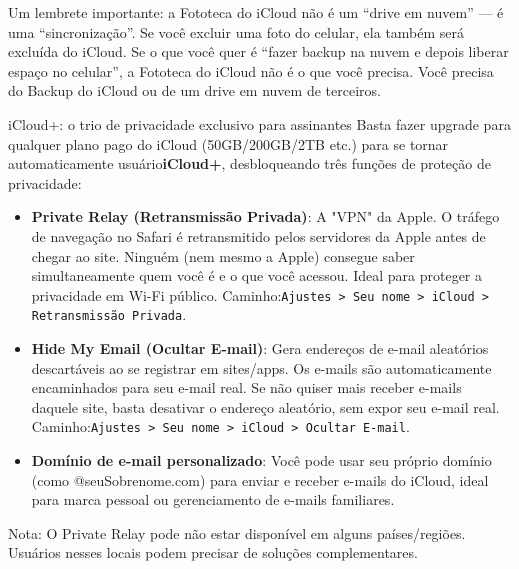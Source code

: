 Um lembrete importante: a Fototeca do iCloud não é um “drive em nuvem” — é uma “sincronização”. Se você excluir uma foto do celular, ela também será excluída do iCloud. Se o que você quer é “fazer backup na nuvem e depois liberar espaço no celular”, a Fototeca do iCloud não é o que você precisa. Você precisa do Backup do iCloud ou de um drive em nuvem de terceiros.

\begin{tcbinfo}{iCloud+: o trio de privacidade exclusivo para assinantes}
Basta fazer upgrade para qualquer plano pago do iCloud (50GB/200GB/2TB etc.) para se tornar automaticamente usuário\textbf{iCloud+}, desbloqueando três funções de proteção de privacidade:

\begin{itemize}
  \item \textbf{Private Relay (Retransmissão Privada)}: A "VPN" da Apple. O tráfego de navegação no Safari é retransmitido pelos servidores da Apple antes de chegar ao site. Ninguém (nem mesmo a Apple) consegue saber simultaneamente quem você é e o que você acessou. Ideal para proteger a privacidade em Wi-Fi público. Caminho:\texttt{Ajustes > Seu nome > iCloud > Retransmissão Privada}.
  \item \textbf{Hide My Email (Ocultar E-mail)}: Gera endereços de e-mail aleatórios descartáveis ao se registrar em sites/apps. Os e-mails são automaticamente encaminhados para seu e-mail real. Se não quiser mais receber e-mails daquele site, basta desativar o endereço aleatório, sem expor seu e-mail real. Caminho:\texttt{Ajustes > Seu nome > iCloud > Ocultar E-\allowbreak mail}.
  \item \textbf{Domínio de e-mail personalizado}: Você pode usar seu próprio domínio (como @seuSobrenome.com) para enviar e receber e-mails do iCloud, ideal para marca pessoal ou gerenciamento de e-mails familiares.
\end{itemize}

Nota: O Private Relay pode não estar disponível em alguns países/regiões. Usuários nesses locais podem precisar de soluções complementares.

\end{tcbinfo}

